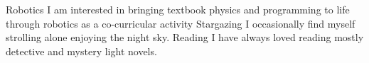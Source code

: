 



\begin{cvskills}
\cvskill
	{Robotics} %
	{I am interested in bringing textbook physics and programming to life through robotics as a co-curricular activity} %
\cvskill
    {Stargazing} %
    {I occasionally find myself strolling alone enjoying the night sky.} %
  \cvskill
    {Reading} %
    {I have always loved reading mostly detective and mystery light novels.} %


\end{cvskills}